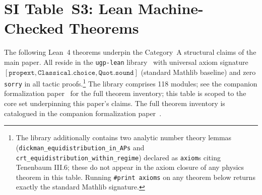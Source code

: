 \documentclass[10pt]{article}
\begin{document}
\begin{longtable}{@{} p{3.5cm} p{3.6cm} p{3.8cm} p{3.9cm} @{}}
\end{longtable}

\section*{SI Table~S3: Lean Machine-Checked Theorems}

The following Lean~4 theorems underpin the Category~A structural claims of the main paper.  All reside in the \texttt{ugp-lean} library~\cite{ugp-lean} with universal axiom signature $[\texttt{propext}, \texttt{Classical.choice}, \texttt{Quot.sound}]$ (standard Mathlib baseline) and zero \texttt{sorry} in all tactic proofs.\footnote{The library additionally contains two analytic number theory lemmas (\texttt{dickman\_equidistribution\_in\_APs} and \texttt{crt\_equidistribution\_within\_regime}) declared as \texttt{axiom}s citing Tenenbaum III.6; these do not appear in the axiom closure of any physics theorem in this table.  Running \texttt{\#print axioms} on any theorem below returns exactly the standard Mathlib signature.}  The library comprises 118 modules; see the companion formalization paper~\cite{SpivackUGPFormalization} for the full theorem inventory; this table is scoped to the core set underpinning this paper's claims.  The full theorem inventory is catalogued in the companion formalization paper~\cite{SpivackUGPFormalization}.
\end{document}

